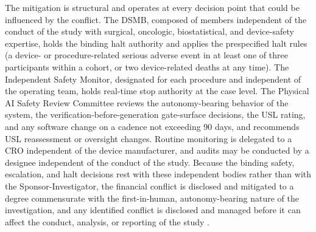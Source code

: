 The mitigation is structural and operates at every decision point that could be
influenced by the conflict. The DSMB, composed of members independent of the conduct
of the study with surgical, oncologic, biostatistical, and device-safety expertise,
holds the binding halt authority and applies the prespecified halt rules (a device-
or procedure-related serious adverse event in at least one of three participants
within a cohort, or two device-related deaths at any time). The Independent Safety
Monitor, designated for each procedure and independent of the operating team, holds
real-time stop authority at the case level. The Physical AI Safety Review Committee
reviews the autonomy-bearing behavior of the system, the verification-before-generation
gate-surface decisions, the USL rating, and any software change on a cadence not
exceeding 90 days, and recommends USL reassessment or oversight changes. Routine
monitoring is delegated to a CRO independent of the device manufacturer, and audits
may be conducted by a designee independent of the conduct of the study. Because the
binding safety, escalation, and halt decisions rest with these independent bodies
rather than with the Sponsor-Investigator, the financial conflict is disclosed and
mitigated to a degree commensurate with the first-in-human, autonomy-bearing nature
of the investigation, and any identified conflict is disclosed and managed before it
can affect the conduct, analysis, or reporting of the study \cite{daraxwhipple}.
